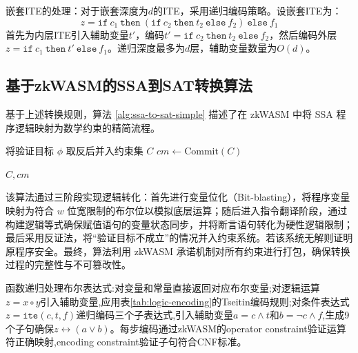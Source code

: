 嵌套ITE的处理：对于嵌套深度为$d$的ITE，采用递归编码策略。设嵌套ITE为：
$$z = \texttt{if}\ c_1\ \texttt{then}\ (\texttt{if}\ c_2\ \texttt{then}\ t_2\ \texttt{else}\ f_2)\ \texttt{else}\ f_1$$
首先为内层ITE引入辅助变量$t'$，编码$t' = \texttt{if}\ c_2\ \texttt{then}\ t_2\ \texttt{else}\ f_2$，然后编码外层$z = \texttt{if}\ c_1\ \texttt{then}\ t'\ \texttt{else}\ f_1$。递归深度最多为$d$层，辅助变量数量为$O(d)$。

\subsection{基于zkWASM的SSA到SAT转换算法}

基于上述转换规则，算法 \ref{alg:ssa-to-sat-simple} 描述了在 zkWASM 中将 SSA 程序逻辑映射为数学约束的精简流程。

\begin{algorithm}[H]
\SetAlgoLined
{}
\label{alg:ssa-to-sat-simple}



将验证目标 $\phi$ 取反后并入约束集 $C$\;
$cm \leftarrow \text{Commit}(C)$ 

\KwRet $C, cm$\;
\end{algorithm}

该算法通过三阶段实现逻辑转化：首先进行变量位化（Bit-blasting），将程序变量映射为符合 $w$ 位宽限制的布尔位以模拟底层运算；随后进入指令翻译阶段，通过构建逻辑等式确保赋值语句的变量状态同步，并将断言语句转化为硬性逻辑限制；最后采用反证法，将“验证目标不成立”的情况并入约束系统。若该系统无解则证明原程序安全。最终，算法利用 zkWASM 承诺机制对所有约束进行打包，确保转换过程的完整性与不可篡改性。

函数递归处理布尔表达式:对变量和常量直接返回对应布尔变量;对逻辑运算$z = x \circ y$引入辅助变量,应用表\ref{tab:logic-encoding}的Tseitin编码规则;对条件表达式$z = \texttt{ite}(c, t, f)$递归编码三个子表达式,引入辅助变量$a = c \wedge t$和$b = \neg c \wedge f$,生成9个子句确保$z \leftrightarrow (a \vee b)$。每步编码通过zkWASM的operator constraint验证运算符正确映射,encoding constraint验证子句符合CNF标准。

